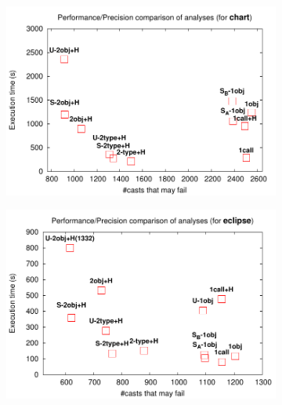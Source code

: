 \begin{figure}[tb!p]
\begin{center}
\begin{subfigure}[b]{0.45\textwidth}
\includegraphics[width=\textwidth]{assets/hybrid/chart.pdf}
\end{subfigure}\hspace{1cm}%
\begin{subfigure}[b]{0.45\textwidth}
\includegraphics[width=\textwidth]{assets/hybrid/eclipse.pdf}
\end{subfigure}


\end{center}
\end{figure}
